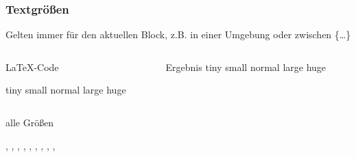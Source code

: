 \begin{frame}[fragile]
    \frametitle{Textgrößen}
    Gelten immer für den aktuellen Block, z.B. in einer Umgebung oder zwischen \{\dots\} 
    \begin{columns}[t]
        \begin{column}{0.47\textwidth}
            \begin{block}{\LaTeX-Code}
            \begin{lstverbatim}
                {\tiny tiny }
                {\small small}
                {\normalsize normal}
                {\large large}
                {\huge huge}
            \end{lstverbatim}
            \end{block}
        \end{column}
        \begin{column}{0.47\textwidth}
            \begin{block}{Ergebnis}
                {\tiny tiny }
                {\small small}
                {\normalsize normal}
                {\large large}
                {\huge huge}
            \end{block}
        \end{column}
    \end{columns}
    \vspace{1em}
    \begin{block}{alle Größen}
        \begin{lstverbatim}
        \tiny, \scriptsize, \footnotesize, \small, \normalsize, \large, \Large, \LARGE, \huge, \Huge
        \end{lstverbatim}
    \end{block}
\end{frame}
